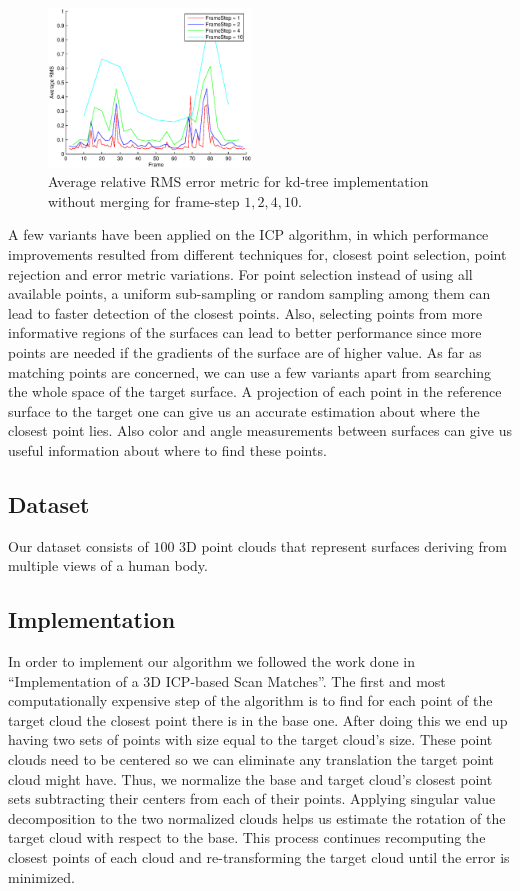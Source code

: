 \begin{figure}[t!]
  \centering
    \includegraphics[width=0.48\textwidth]{figures/RMSunmergedKD.eps}
    \caption{Average relative RMS error metric for kd-tree implementation without merging for frame-step $1,2,4,10$.}
    \label{fig:rmsunmergederror}
\end{figure}

A few variants have been applied on the ICP algorithm, in which performance improvements resulted from different techniques for, closest point selection, point rejection and error metric variations. For point selection instead of using all available points, a uniform sub-sampling or random sampling among them can lead to faster detection of the closest points. Also, selecting points from more informative regions of the surfaces can lead to better performance since more points are needed if the gradients of the surface are of higher value. As far as matching points are concerned, we can use a few variants apart from searching the whole space of the target surface. A projection of each point in the reference surface to the target one can give us an accurate estimation about where the closest point lies. Also color and angle measurements between surfaces can give us useful information about where to find these points.

\subsection*{Dataset}
Our dataset consists of $100$ 3D point clouds that represent surfaces deriving from multiple views of a human body. 

\subsection{Implementation}
In order to implement our algorithm we followed the work done in ``Implementation of a 3D ICP-based Scan Matches''. The first and most computationally expensive step of the algorithm is to find for each point of the target cloud the closest point there is in the base one. After doing this we end up having two sets of points with size equal to the target cloud's size. These point clouds need to be centered so we can eliminate any translation the target point cloud might have. Thus, we normalize the base and target cloud's closest point sets subtracting their centers from each of their points. Applying singular value decomposition to the two normalized clouds helps us estimate the rotation of the target cloud with respect to the base. This process continues recomputing the closest points of each cloud and re-transforming the target cloud until the error is minimized.

